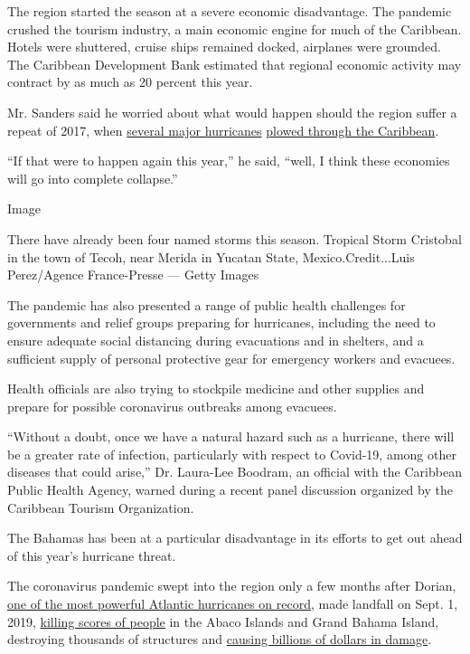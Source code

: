 The region started the season at a severe economic disadvantage. The
pandemic crushed the tourism industry, a main economic engine for much
of the Caribbean. Hotels were shuttered, cruise ships remained docked,
airplanes were grounded. The Caribbean Development Bank estimated that
regional economic activity may contract by as much as 20 percent this
year.

Mr. Sanders said he worried about what would happen should the region
suffer a repeat of 2017, when
\href{https://www.nytimes.com/2017/09/08/world/americas/caribbean-islands-hurricane-irma-st-martin-barbuda-anguilla.html}{several
major hurricanes}
\href{https://www.nytimes.com/2017/09/19/world/americas/hurricane-maria-caribbean.html}{plowed
through the Caribbean}.

``If that were to happen again this year,'' he said, ``well, I think
these economies will go into complete collapse.''

Image

There have already been four named storms this season. Tropical Storm
Cristobal in the town of Tecoh, near Merida in Yucatan State,
Mexico.Credit...Luis Perez/Agence France-Presse --- Getty Images

The pandemic has also presented a range of public health challenges for
governments and relief groups preparing for hurricanes, including the
need to ensure adequate social distancing during evacuations and in
shelters, and a sufficient supply of personal protective gear for
emergency workers and evacuees.

Health officials are also trying to stockpile medicine and other
supplies and prepare for possible coronavirus outbreaks among evacuees.

``Without a doubt, once we have a natural hazard such as a hurricane,
there will be a greater rate of infection, particularly with respect to
Covid-19, among other diseases that could arise,'' Dr. Laura-Lee
Boodram, an official with the Caribbean Public Health Agency, warned
during a recent panel discussion organized by the Caribbean Tourism
Organization.

The Bahamas has been at a particular disadvantage in its efforts to get
out ahead of this year's hurricane threat.

The coronavirus pandemic swept into the region only a few months after
Dorian,
\href{https://www.nytimes.com/2019/09/02/world/americas/hurricane-dorian-bahamas.html}{one
of the most powerful Atlantic hurricanes on record}, made landfall on
Sept. 1, 2019,
\href{https://www.nytimes.com/2019/09/08/world/americas/bahamas-dead-dorian.html}{killing
scores of people} in the Abaco Islands and Grand Bahama Island,
destroying thousands of structures and
\href{https://www.nytimes.com/2019/09/07/world/americas/bahamas-hurricane-dorian-relief.html}{causing
billions of dollars in damage}.


